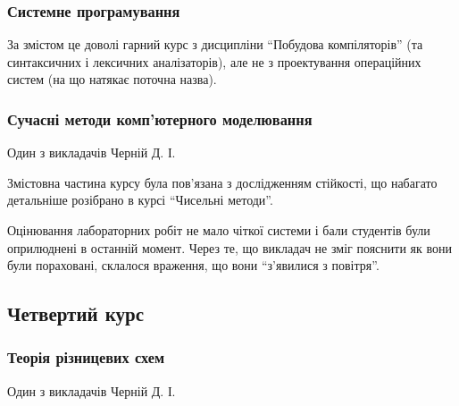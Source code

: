 \documentclass[14pt, a4paper]{extarticle}  %
\begin{document}





\subsubsection{Системне програмування}

За змістом це доволі гарний курс з дисципліни ``Побудова компіляторів'' (та синтаксичних і лексичних аналізаторів), але не з проектування операційних систем (на що натякає поточна назва). 

\subsubsection{Сучасні методи комп'ютерного моделювання}
Один з викладачів Черній Д. І.

Змістовна частина курсу була пов'язана з дослідженням стійкості, що набагато детальніше розібрано в курсі ``Чисельні методи''.

Оцінювання лабораторних робіт не мало чіткої системи і бали студентів були оприлюднені в останній момент. Через те, що  викладач не зміг пояснити як вони були пораховані, склалося враження, що вони ``з'явилися з повітря''. 

\subsection{Четвертий курс}
\subsubsection{Теорія різницевих схем} 
Один з викладачів Черній Д. І.
\end{document}

